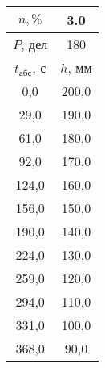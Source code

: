 \begin{tabular}[t]{|c|c|}
\hline
$n, \%$ & 3.0 \\
\hline
$P$, дел & 180 \\
\hline
$t_{абс}$, с & $h$, мм \\ 
\hline
0,0 & 200,0 \\ 
29,0 & 190,0 \\ 
61,0 & 180,0 \\ 
92,0 & 170,0 \\ 
124,0 & 160,0 \\ 
156,0 & 150,0 \\ 
190,0 & 140,0 \\ 
224,0 & 130,0 \\ 
259,0 & 120,0 \\ 
294,0 & 110,0 \\ 
331,0 & 100,0 \\ 
368,0 & 90,0 \\ 
\hline
\end{tabular}